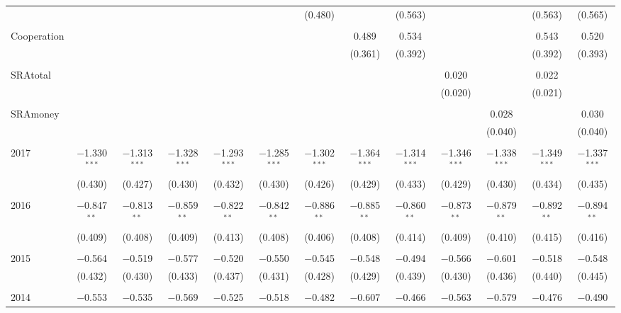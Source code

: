 \begin{subtables}
\begin{table}[H]
\begin{adjustbox}{width=\textwidth}
\begin{tabular}{@{\extracolsep{5pt}}lcccccccccccc}
  &  &  &  &  &  & (0.480) &  & (0.563) &  &  & (0.563) & (0.565) \\ 
  & & & & & & & & & & & & \\ 
 Cooperation &  &  &  &  &  &  & 0.489 & 0.534 &  &  & 0.543 & 0.520 \\ 
  &  &  &  &  &  &  & (0.361) & (0.392) &  &  & (0.392) & (0.393) \\ 
  & & & & & & & & & & & & \\ 
 SRAtotal &  &  &  &  &  &  &  &  & 0.020 &  & 0.022 &  \\ 
  &  &  &  &  &  &  &  &  & (0.020) &  & (0.021) &  \\ 
  & & & & & & & & & & & & \\ 
 SRAmoney &  &  &  &  &  &  &  &  &  & 0.028 &  & 0.030 \\ 
  &  &  &  &  &  &  &  &  &  & (0.040) &  & (0.040) \\ 
  & & & & & & & & & & & & \\ 
 2017 & $-$1.330$^{***}$ & $-$1.313$^{***}$ & $-$1.328$^{***}$ & $-$1.293$^{***}$ & $-$1.285$^{***}$ & $-$1.302$^{***}$ & $-$1.364$^{***}$ & $-$1.314$^{***}$ & $-$1.346$^{***}$ & $-$1.338$^{***}$ & $-$1.349$^{***}$ & $-$1.337$^{***}$ \\ 
  & (0.430) & (0.427) & (0.430) & (0.432) & (0.430) & (0.426) & (0.429) & (0.433) & (0.429) & (0.430) & (0.434) & (0.435) \\ 
  & & & & & & & & & & & & \\ 
 2016 & $-$0.847$^{**}$ & $-$0.813$^{**}$ & $-$0.859$^{**}$ & $-$0.822$^{**}$ & $-$0.842$^{**}$ & $-$0.886$^{**}$ & $-$0.885$^{**}$ & $-$0.860$^{**}$ & $-$0.873$^{**}$ & $-$0.879$^{**}$ & $-$0.892$^{**}$ & $-$0.894$^{**}$ \\ 
  & (0.409) & (0.408) & (0.409) & (0.413) & (0.408) & (0.406) & (0.408) & (0.414) & (0.409) & (0.410) & (0.415) & (0.416) \\ 
  & & & & & & & & & & & & \\ 
 2015 & $-$0.564 & $-$0.519 & $-$0.577 & $-$0.520 & $-$0.550 & $-$0.545 & $-$0.548 & $-$0.494 & $-$0.566 & $-$0.601 & $-$0.518 & $-$0.548 \\ 
  & (0.432) & (0.430) & (0.433) & (0.437) & (0.431) & (0.428) & (0.429) & (0.439) & (0.430) & (0.436) & (0.440) & (0.445) \\ 
  & & & & & & & & & & & & \\ 
 2014 & $-$0.553 & $-$0.535 & $-$0.569 & $-$0.525 & $-$0.518 & $-$0.482 & $-$0.607 & $-$0.466 & $-$0.563 & $-$0.579 & $-$0.476 & $-$0.490 \\ 

\end{tabular}
\end{adjustbox}
\end{table}
\end{subtables}
